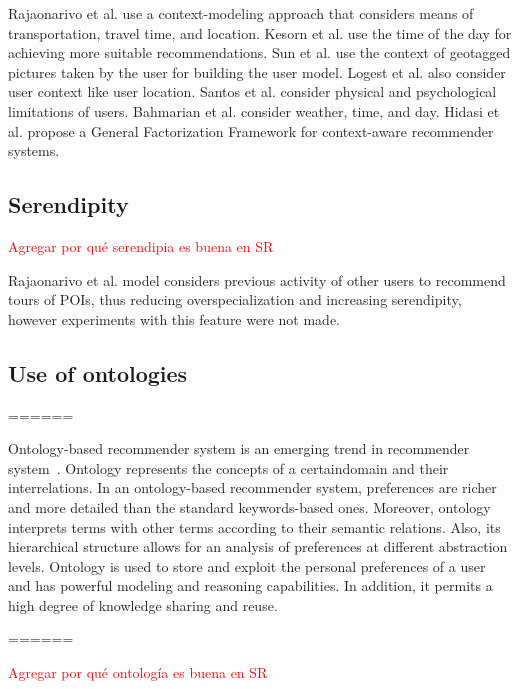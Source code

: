 Rajaonarivo et al.\cite{rajaonarivo2019rec} use a
context-modeling approach that considers means of transportation, travel time, and location. Kesorn et al. \cite{kesorn2017personalized} use the time of the day for achieving more suitable recommendations. Sun et al. \cite{sun2019building} use the context of geotagged pictures taken by the user for building the user model. Logest et al. \cite{logesh2019exploring} \cite{logesh2018personalised} also consider user context like user location. Santos et al. \cite{santos2019using} consider physical and psychological limitations of users. Bahmarian et al. \cite{bahramian_abbaspour_claramunt_2017} consider weather, time, and day. Hidasi et al. \cite{hidasi2016general} propose a General Factorization Framework for context-aware recommender systems.

\subsection{Serendipity}

\textcolor{red}{Agregar por qué serendipia es buena en SR}

Rajaonarivo et al. \cite{rajaonarivo2019rec} model considers previous activity of other users to recommend tours of POIs, thus reducing overspecialization and increasing serendipity, however experiments with this feature were not made.

\subsection{Use of ontologies}

======

Ontology-based  recommender  system  is  an  emerging  trend  in recommender   system~\cite{borras2014intelligent,yochum2020linked}.   Ontology represents   the   concepts   of   a certaindomain   and   their interrelations. In   an   ontology-based   recommender   system, preferences  are  richer  and  more  detailed  than  the  standard keywords-based ones. Moreover, ontology interprets terms with other  terms  according  to  their  semantic  relations.  Also,  its hierarchical  structure  allows  for  an  analysis  of  preferences  at different abstraction levels. Ontology is used to store and exploit the personal preferences of a user and has powerful modeling and reasoning  capabilities.  In  addition,  it  permits  a  high  degree  of knowledge sharing and reuse.


======


\textcolor{red}{Agregar por qué ontología es buena en SR}


